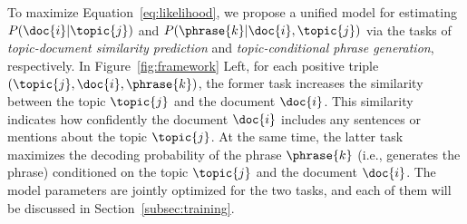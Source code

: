 To maximize Equation~\eqref{eq:likelihood}, we propose a unified model for estimating $P(\doc{i}|\topic{j})$ and $P(\phrase{k}|\doc{i},\topic{j})$ via the tasks of \textit{topic-document similarity prediction} and \textit{topic-conditional phrase generation}, respectively.
In Figure~\ref{fig:framework} Left, for each positive triple $(\topic{j}, \doc{i}, \phrase{k})$, the former task increases the similarity between the topic $\topic{j}$ and the document $\doc{i}$.
This similarity indicates how confidently the document $\doc{i}$ includes any sentences or mentions about the topic $\topic{j}$.
At the same time, the latter task maximizes the decoding probability of the phrase $\phrase{k}$ (i.e., generates the phrase) 
conditioned on the topic $\topic{j}$ and the document $\doc{i}$.
The model parameters are jointly optimized for the two tasks, and each of them will be discussed in Section~\ref{subsec:training}.

